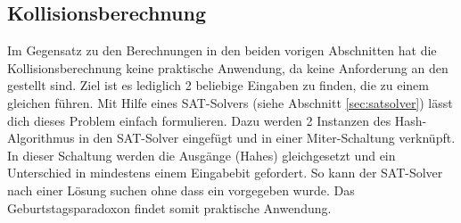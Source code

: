 \subsection{Kollisionsberechnung}
\label{sec:kollisionsberechnung}
Im Gegensatz zu den Berechnungen in den beiden vorigen Abschnitten hat die Kollisionsberechnung keine praktische Anwendung, da keine Anforderung an
den  gestellt sind. Ziel ist es lediglich 2 beliebige Eingaben zu finden, die zu einem gleichen  führen. Mit Hilfe eines SAT-Solvers
(siehe Abschnitt \ref{sec:satsolver}) lässt dich dieses Problem einfach formulieren. Dazu werden 2 Instanzen des Hash-Algorithmus in den SAT-Solver eingefügt
und in einer Miter-Schaltung \cite{mitergraph} verknüpft. In dieser Schaltung werden die Ausgänge (Hahes) gleichgesetzt und ein Unterschied in mindestens
einem Eingabebit gefordert. So kann der SAT-Solver nach einer Lösung suchen ohne dass ein  vorgegeben wurde. Das Geburtstagsparadoxon findet somit
praktische Anwendung.